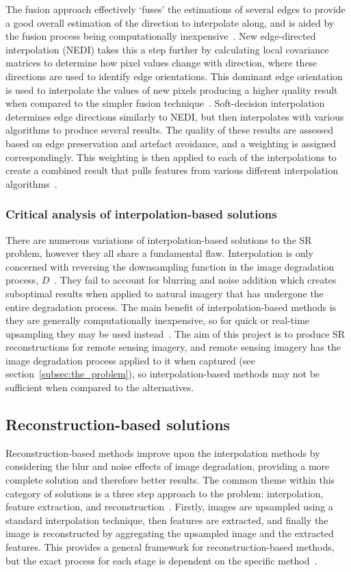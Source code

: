 The fusion approach effectively `fuses' the estimations of several edges to provide a good overall estimation of the direction to interpolate along, and is aided by the fusion process being computationally inexpensive~\cite{interpolation}. New edge-directed interpolation (NEDI) takes this a step further by calculating local covariance matrices to determine how pixel values change with direction, where these directions are used to identify edge orientations. This dominant edge orientation is used to interpolate the values of new pixels producing a higher quality result when compared to the simpler fusion technique~\cite{ref}. Soft-decision interpolation determines edge directions similarly to NEDI, but then interpolates with various algorithms to produce several results. The quality of these results are assessed based on edge preservation and artefact avoidance, and a weighting is assigned correspondingly. This weighting is then applied to each of the interpolations to create a combined result that pulls features from various different interpolation algorithms~\cite{ref}.

\subsubsection{Critical analysis of interpolation-based solutions}
There are numerous variations of interpolation-based solutions to the SR problem, however they all share a fundamental flaw. Interpolation is only concerned with reversing the downsampling function in the image degradation process, $D$~\cite{interpolation}. They fail to account for blurring and noise addition which creates suboptimal results when applied to natural imagery that has undergone the entire degradation process. The main benefit of interpolation-based methods is they are generally computationally inexpensive, so for quick or real-time upsampling they may be used instead~\cite{interpolation}. The aim of this project is to produce SR reconstructions for remote sensing imagery, and remote sensing imagery has the image degradation process applied to it when captured (see section~\ref{subsec:the_problem}), so interpolation-based methods may not be sufficient when compared to the alternatives.

\subsection{Reconstruction-based solutions}
Reconstruction-based methods improve upon the interpolation methods by considering the blur and noise effects of image degradation, providing a more complete solution and therefore better results. The common theme within this category of solutions is a three step approach to the problem: interpolation, feature extraction, and reconstruction~\cite{superResRemoteSensingOverview}. Firstly, images are upsampled using a standard interpolation technique, then features are extracted, and finally the image is reconstructed by aggregating the upsampled image and the extracted features. This provides a general framework for reconstruction-based methods, but the exact process for each stage is dependent on the specific method~\cite{superResRemoteSensingOverview}.

